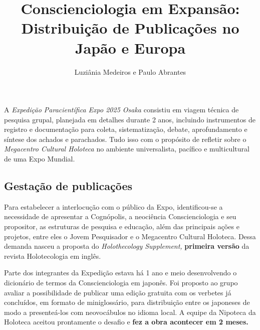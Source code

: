 \documentclass{gescons}
\author{Luziânia Medeiros e Paulo Abrantes}
\title{Conscienciologia em Expansão: Distribuição de Publicações no Japão e Europa}
\begin{document}
    \makeentrevistatitle


    




A \emph{Expedição Paracientífica Expo 2025 Osaka} consistiu em viagem técnica de pesquisa grupal, planejada em detalhes durante 2 anos, incluindo instrumentos de registro e documentação para coleta, sistematização, debate, aprofundamento e síntese dos achados e parachados. Tudo isso com o propósito de refletir sobre o \emph{Megacentro Cultural Holoteca} no ambiente universalista, pacífico e multicultural de uma Expo Mundial.

\subsection*{Gestação de publicações}

Para estabelecer a interlocução com o público da Expo, identificou-se a necessidade de apresentar a Cognópolis, a neociência Conscienciologia e seu propositor, as estruturas de pesquisa e educação, além das principais ações e projetos, entre eles o Jovem Pesquisador e o Megacentro Cultural Holoteca. Dessa demanda nasceu a proposta do \emph{Holothecology Supplement,} \textbf{primeira versão} da revista Holotecologia em inglês.

Parte dos integrantes da Expedição estava há 1 ano e meio desenvolvendo o dicionário de termos da Conscienciologia em japonês. Foi proposto ao grupo avaliar a possibilidade de publicar uma edição gratuita com os verbetes já concluídos, em formato de miniglossário, para distribuição entre os japoneses de modo a presenteá-los com neovocábulos no idioma local. A equipe da Nipoteca da Holoteca aceitou prontamente o desafio e \textbf{fez a obra acontecer em 2 meses.}
\end{document}

